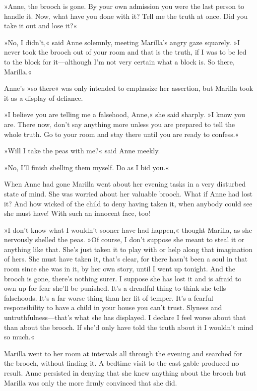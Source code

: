 »Anne, the brooch is gone. By your own admission you were the last person to handle it. Now, what have you done with it? Tell me the truth at once. Did you take it out and lose it?«

»No, I didn't,« said Anne solemnly, meeting Marilla's angry gaze squarely. »I never took the brooch out of your room and that is the truth, if I was to be led to the block for it—although I'm not very certain what a block is. So there, Marilla.«

Anne's »so there« was only intended to emphasize her assertion, but Marilla took it as a display of defiance.

»I believe you are telling me a falsehood, Anne,« she said sharply. »I know you are. There now, don't say anything more unless you are prepared to tell the whole truth. Go to your room and stay there until you are ready to confess.«

»Will I take the peas with me?« said Anne meekly.

»No, I'll finish shelling them myself. Do as I bid you.«

When Anne had gone Marilla went about her evening tasks in a very disturbed state of mind. She was worried about her valuable brooch. What if Anne had lost it? And how wicked of the child to deny having taken it, when anybody could see she must have! With such an innocent face, too!

»I don't know what I wouldn't sooner have had happen,« thought Marilla, as she nervously shelled the peas. »Of course, I don't suppose she meant to steal it or anything like that. She's just taken it to play with or help along that imagination of hers. She must have taken it, that's clear, for there hasn't been a soul in that room since she was in it, by her own story, until I went up tonight. And the brooch is gone, there's nothing surer. I suppose she has lost it and is afraid to own up for fear she'll be punished. It's a dreadful thing to think she tells falsehoods. It's a far worse thing than her fit of temper. It's a fearful responsibility to have a child in your house you can't trust. Slyness and untruthfulness—that's what she has displayed. I declare I feel worse about that than about the brooch. If she'd only have told the truth about it I wouldn't mind so much.«

Marilla went to her room at intervals all through the evening and searched for the brooch, without finding it. A bedtime visit to the east gable produced no result. Anne persisted in denying that she knew anything about the brooch but Marilla was only the more firmly convinced that she did.

